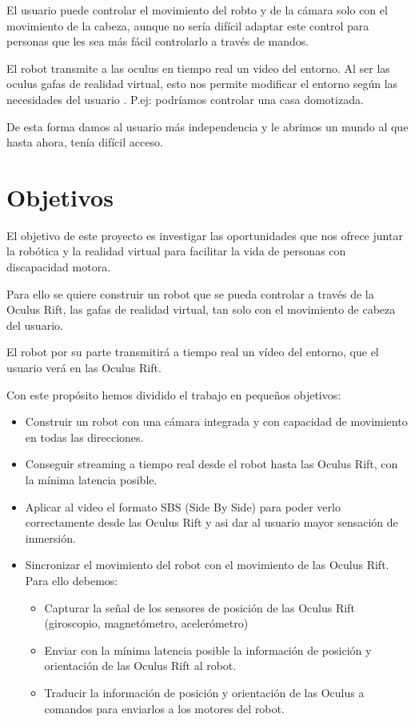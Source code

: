 \documentclass[twoside, 12pt]{epstfg}
\begin{document}
El usuario puede controlar el movimiento del robto y de la cámara solo con el movimiento de la cabeza, aunque no sería difícil adaptar este control para personas que les sea más fácil controlarlo a través de mandos.

El robot transmite a las oculus en tiempo real un video del entorno. Al ser las oculus gafas de realidad virtual, esto nos permite modificar el entorno según las necesidades del usuario . P.ej: podríamos controlar una casa domotizada.

De esta forma damos al usuario más independencia y le abrimos un mundo al que hasta ahora, tenía difícil acceso.


\section{Objetivos}
El objetivo de este proyecto es investigar las oportunidades que nos ofrece juntar la robótica y la realidad virtual para facilitar la vida de personas con discapacidad motora.

Para ello se quiere construir un robot que se pueda controlar a través de la Oculus Rift, las gafas de realidad virtual, tan solo con el movimiento de cabeza del usuario.

El robot por su parte transmitirá a tiempo real un vídeo del entorno, que el usuario verá en las Oculus Rift.

Con este propósito hemos dividido el trabajo en pequeños objetivos:

\begin{itemize}
	\item Construir un robot con una cámara integrada y con capacidad de movimiento en todas las direcciones.
	
	\item Conseguir streaming a tiempo real desde el robot hasta las Oculus Rift, con la mínima latencia posible.
	
	\item Aplicar al video el formato SBS (Side By Side) para poder verlo correctamente desde las Oculus Rift y asi dar al usuario mayor sensación de inmersión.
	
	\item Sincronizar el movimiento del robot con el movimiento de las Oculus Rift. Para ello debemos:
	
	\begin{itemize}
		\item Capturar la señal de los sensores de posición de las Oculus Rift (giroscopio, magnetómetro, acelerómetro)
		
		\item Enviar con la mínima latencia posible la información de posición y orientación de las Oculus Rift al robot.
		
		\item Traducir la información de posición y orientación de las Oculus a comandos para enviarlos a los motores del robot.
	\end{itemize}
\end{itemize}
\end{document}
